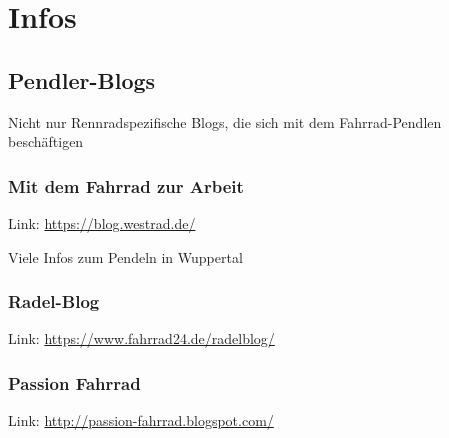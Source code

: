 \chapter{Infos}

\section{Pendler-Blogs}

Nicht nur Rennradspezifische Blogs, die sich mit dem Fahrrad-Pendlen beschäftigen

\subsection{Mit dem Fahrrad zur Arbeit}

Link: \url{https://blog.westrad.de/}

Viele Infos zum Pendeln in Wuppertal

\subsection{Radel-Blog}

Link: \url{https://www.fahrrad24.de/radelblog/}

\subsection{Passion Fahrrad}

Link: \url{http://passion-fahrrad.blogspot.com/}
